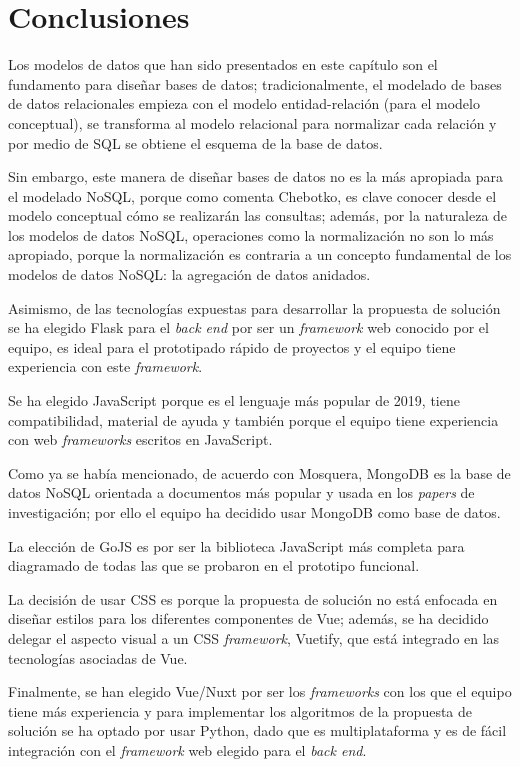 \section{Conclusiones}\label{ref:conclusiones-cap3}


Los modelos de datos que han sido presentados en este capítulo son el fundamento para diseñar bases de datos; tradicionalmente, el modelado de bases de datos relacionales empieza con el modelo entidad-relación (para el modelo conceptual), se transforma al modelo relacional para normalizar cada relación y por medio de SQL se obtiene el esquema de la base de datos. 


Sin embargo, este manera de diseñar bases de datos no es la más apropiada para el modelado NoSQL, porque como comenta Chebotko\cite{chebotko_big_2015}, es clave conocer desde el modelo conceptual cómo se realizarán las consultas; además, por la naturaleza de los modelos de datos NoSQL, operaciones como la normalización no son lo más apropiado, porque la normalización es contraria a un concepto fundamental de los modelos de datos NoSQL: la agregación de datos anidados.

Asimismo, de las tecnologías expuestas para desarrollar la propuesta de solución se ha elegido Flask para el \textit{back end} por ser un \textit{framework} web conocido por el equipo, es ideal para el prototipado rápido de proyectos y el equipo tiene experiencia con este \textit{framework}.


Se ha elegido JavaScript porque es el lenguaje más popular de 2019, tiene compatibilidad, material de ayuda y también porque el equipo tiene experiencia con web \textit{frameworks} escritos en JavaScript.


Como ya se había mencionado, de acuerdo con Mosquera\cite{martinez-mosquera_modeling_2020}, MongoDB es la base de datos NoSQL orientada a documentos más popular y usada en los \textit{papers} de investigación; por ello el equipo ha decidido usar MongoDB como base de datos.


La elección de GoJS es por ser la biblioteca JavaScript más completa para diagramado de todas las que se probaron en el prototipo funcional.



La decisión de usar CSS es porque la propuesta de solución no está enfocada en diseñar estilos para los diferentes componentes de Vue; además, se ha decidido delegar el aspecto visual a un CSS \textit{framework}, Vuetify, que está integrado en las tecnologías asociadas de Vue.


Finalmente, se han elegido Vue/Nuxt por ser los \textit{frameworks} con los que el equipo tiene más experiencia y para implementar los algoritmos de la propuesta de solución se ha optado por usar Python, dado que es multiplataforma y es de fácil integración con el \textit{framework} web elegido para el \textit{back end}.
